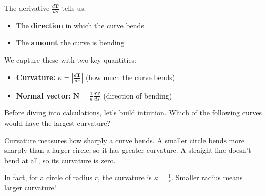 \documentclass{ximera}
\begin{document}
\begin{definition}
The derivative $\frac{d\mathbf{T}}{ds}$ tells us:
\begin{itemize}
    \item The \textbf{direction} in which the curve bends
    \item The \textbf{amount} the curve is bending
\end{itemize}

We capture these with two key quantities:
\begin{itemize}
    \item \textbf{Curvature:} $\kappa=\left|\frac{d\mathbf{T}}{ds}\right|$ (how much the curve bends)
    \item \textbf{Normal vector:} $\mathbf{N}=\frac{1}{\kappa}\frac{d\mathbf{T}}{ds}$ (direction of bending)
\end{itemize}
\end{definition}

\begin{problem}
Before diving into calculations, let's build intuition. Which of the following curves would have the largest curvature?

\begin{multipleChoice}
\end{multipleChoice}

\begin{feedback}
Curvature measures how sharply a curve bends. A smaller circle bends more sharply than a larger circle, so it has greater curvature. A straight line doesn't bend at all, so its curvature is zero.

In fact, for a circle of radius $r$, the curvature is $\kappa = \frac{1}{r}$. Smaller radius means larger curvature!
\end{feedback}
\end{problem}
\end{document}
